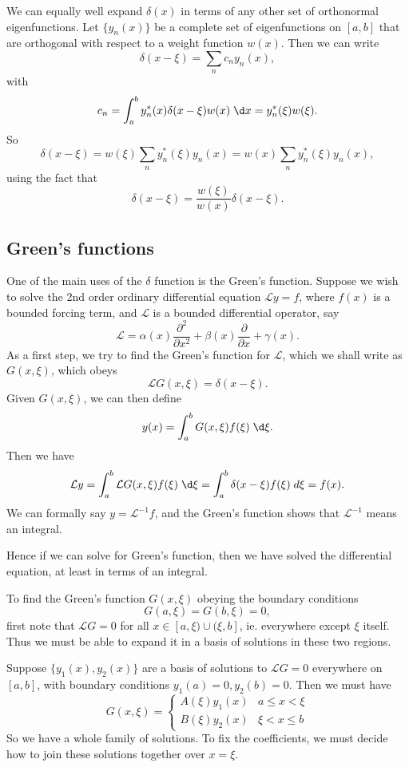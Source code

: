 \documentclass[a4paper]{article}
\begin{document}
We can equally well expand $\delta(x)$ in terms of any other set of orthonormal eigenfunctions. Let $\{y_n(x)\}$ be a complete set of eigenfunctions on $[a, b]$ that are orthogonal with respect to a weight function $w(x)$. Then we can write
\[
  \delta (x - \xi) = \sum_{n} c_n y_n(x),
\]
with
\[
  c_n = \int_a^b y_n^*(x) \delta(x - \xi) w(x)\;\d x = y_n^*(\xi) w(\xi).
\]
So
\[
  \delta(x - \xi) = w(\xi) \sum_n y_n^* (\xi) y_n(x) = w(x) \sum_n y_n^*(\xi) y_n(x),
\]
using the fact that
\[
  \delta(x - \xi) = \frac{w(\xi)}{w(x)} \delta(x - \xi).
\]
\subsection{Green's functions}
One of the main uses of the $\delta$ function is the Green's function. Suppose we wish to solve the 2nd order ordinary differential equation $\mathcal{L}y = f$, where $f(x)$ is a bounded forcing term, and $\mathcal{L}$ is a bounded differential operator, say
\[
  \mathcal{L} = \alpha(x) \frac{\partial^2}{\partial x^2} + \beta(x) \frac{\partial}{\partial x} + \gamma(x).
\]
As a first step, we try to find the Green's function for $\mathcal{L}$, which we shall write as $G(x, \xi)$, which obeys
\[
  \mathcal{L} G(x, \xi) = \delta(x - \xi).
\]
Given $G(x, \xi)$, we can then define
\[
  y(x) = \int_{a}^b G(x, \xi) f(\xi) \;\d \xi.
\]
Then we have
\[
  \mathcal{L}y = \int_a^b \mathcal{L} G(x, \xi) f(\xi)\;\d \xi = \int_a^b \delta(x - \xi) f(\xi) \;d\xi = f(x).
\]
We can formally say $y = \mathcal{L}^{-1} f$, and the Green's function shows that $\mathcal{L}^{-1}$ means an integral.

Hence if we can solve for Green's function, then we have solved the differential equation, at least in terms of an integral.

To find the Green's function $G(x, \xi)$ obeying the boundary conditions
\[
  G(a, \xi) = G(b, \xi) = 0,
\]
first note that $\mathcal{L} G = 0$ for all $x \in [a, \xi) \cup (\xi, b]$, ie. everywhere except $\xi$ itself. Thus we must be able to expand it in a basis of solutions in these two regions.

Suppose $\{y_1(x), y_2(x)\}$ are a basis of solutions to $\mathcal{L}G = 0$ everywhere on $[a, b]$, with boundary conditions $y_1(a) = 0, y_2(b) = 0$. Then we must have
\[
  G(x, \xi) =
  \begin{cases}
    A(\xi) y_1(x) & a \leq x < \xi\\
    B(\xi) y_2(x) & \xi < x \leq b
  \end{cases}
\]
So we have a whole family of solutions. To fix the coefficients, we must decide how to join these solutions together over $x = \xi$.
\end{document}
